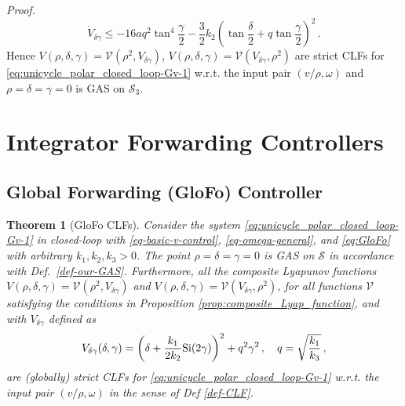 \documentclass[journal,twoside,web]{ieeecolor}
\newtheorem{theorem}{Theorem}
\theoremstyle{definition}
\newcommand{\abs}[1]{\left\lvert#1\right\rvert}
\renewenvironment{proof}[1][Proof]{\par\pushQED{\qed}\normalfont\textit{#1.}~}{\popQED\par}
\begin{document}
\begin{proof}
\begin{equation}
\dot V_{\delta \gamma} \le  - 16 a q^2 \tan^4\frac{\gamma}{2} -  \frac{3}{2}k_2 \left(\tan \frac{\delta}{2} + q \tan \frac{\gamma}{2}\right)^2
\label{eq:V_dot_AbounD} \,.
\end{equation}
Hence $V(\rho, \delta, \gamma) = \mathcal{V}(\rho^2, V_{\delta \gamma})$, $V(\rho, \delta, \gamma) = \mathcal{V}(V_{\delta \gamma},\rho^2)$ are strict CLFs for \eqref{eq:unicycle_polar_closed_loop-Gv-1} w.r.t. the input pair $(v/\rho, \omega)$  and
$\rho =  \delta = \gamma = 0$ is GAS on $\mathcal{S}_3$.
\end{proof}

\section{Integrator Forwarding Controllers}

\subsection{Global Forwarding (GloFo) Controller}


\begin{theorem}[GloFo CLFs] 
\label{thm:CLF_GloFo}
Consider the system \eqref{eq:unicycle_polar_closed_loop-Gv-1} in closed-loop with \eqref{eq-basic-v-control}, \eqref{eq-omega-general}, and \eqref{eq:GloFo} with arbitrary $k_1, k_2, k_3 > 0$.
The point $\rho = \delta = \gamma = 0$ is GAS on $\mathcal{S}$ in accordance with Def.~\ref{def-our-GAS}.
Furthermore, all the composite Lyapunov functions $V(\rho, \delta, \gamma) = \mathcal{V}(\rho^2, V_{\delta \gamma})$ and $V(\rho, \delta, \gamma) = \mathcal{V}(V_{\delta \gamma},\rho^2)$, for all functions $\mathcal{V}$ satisfying the conditions in Proposition \ref{prop:composite_Lyap_function}, and with $V_{\delta \gamma}$ defined as
\begin{equation}
V_{\delta \gamma}(\delta, \gamma)  = 
\left(\delta + \frac{k_1}{2k_2} {\rm Si}(2\gamma) \right)^2 + q^2 \gamma^2 
\,,  \quad q = \sqrt{\frac{k_1}{k_3}} \,, \label{eq:CLF_GloFo_gamma_delta}
\end{equation}
 are (globally) strict CLFs for \eqref{eq:unicycle_polar_closed_loop-Gv-1} w.r.t. the input pair $(v/\rho,\omega)$ in the sense of Def \ref{def-CLF}. 
\end{theorem}
\end{document}

